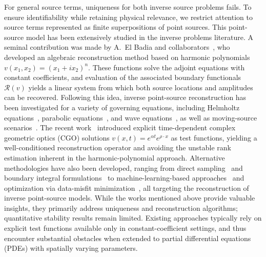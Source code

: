 \documentclass[12pt]{amsart}
\begin{document}
For general source terms, uniqueness for both inverse source problems fails. To ensure identifiability while retaining physical relevance, we restrict attention to source terms represented as finite superpositions of point sources. This point-source model has been extensively studied in the inverse problems literature. 
A seminal contribution was made by A.~El Badia and collaborators~\cite{ElBadiaHa-Duong2000}, who developed an algebraic reconstruction method based on harmonic polynomials $v(x_1,x_2)=(x_1+ix_2)^n$. These functions solve the adjoint equations with constant coefficients, and evaluation of the associated boundary functionals $\mathcal{R}(v)$ yields a linear system from which both source locations and amplitudes can be recovered.
Following this idea, inverse point-source reconstruction has been investigated for a variety of governing equations, including Helmholtz equations~\cite{badia_inverse_2011}, parabolic equations~\cite{ElBadiaHa-Duong2002, andrle_inverse_2015}, and wave equations~\cite{ohe_real-time_2011}, as well as moving-source scenarios~\cite{oheRealtimeReconstructionMoving2020, andrle_identification_2012}. 
The recent work~\cite{qiu_traceability_2025} introduced explicit time-dependent complex geometric optics (CGO) solutions $v(x,t)=e^{\alpha t}e^{\rho\cdot x}$ as test functions, yielding a well-conditioned reconstruction operator and avoiding the unstable rank estimation inherent in the harmonic-polynomial approach. 
Alternative methodologies have also been developed, ranging from direct sampling~\cite{qiu_direct_2024} and boundary integral formulations~\cite{sun_novel_2025} to machine-learning-based approaches~\cite{hu_point_2024} and optimization via data-misfit minimization~\cite{huang_point_2025}, all targeting the reconstruction of inverse point-source models.
While the works mentioned above provide valuable insights, they primarily address uniqueness and reconstruction algorithms; quantitative stability results remain limited. Existing approaches typically rely on explicit test functions available only in constant-coefficient settings, and thus encounter substantial obstacles when extended to partial differential equations (PDEs) with spatially varying parameters.
\end{document}
